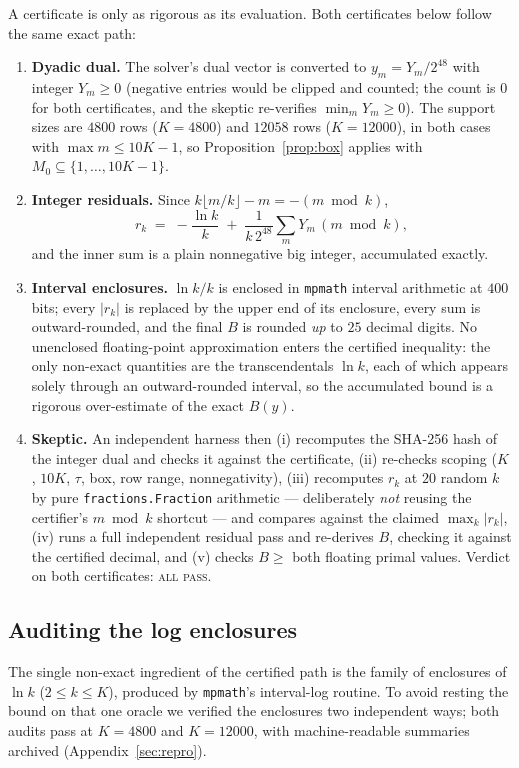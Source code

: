 \documentclass[11pt]{article}
\theoremstyle{remark}
\begin{document}
A certificate is only as rigorous as its evaluation. Both certificates
below follow the same exact path:
\begin{enumerate}
\item \textbf{Dyadic dual.} The solver's dual vector is converted to
$y_m = Y_m / 2^{48}$ with integer $Y_m \ge 0$ (negative entries would be
clipped and counted; the count is $0$ for both certificates, and the
skeptic re-verifies $\min_m Y_m \ge 0$). The support sizes are $4800$
rows ($K = 4800$) and $12058$ rows ($K = 12000$), in both cases with
$\max m \le 10K - 1$, so Proposition~\ref{prop:box} applies with
$M_0 \subseteq \{1,\dots,10K-1\}$.
\item \textbf{Integer residuals.} Since $k\lfloor m/k\rfloor - m =
-(m \bmod k)$,
\[
r_k \;=\; -\frac{\ln k}{k} \;+\; \frac{1}{k\, 2^{48}}
\sum_{m} Y_m\, (m \bmod k),
\]
and the inner sum is a plain nonnegative big integer, accumulated exactly.
\item \textbf{Interval enclosures.} $\ln k / k$ is enclosed in
\texttt{mpmath} interval arithmetic at $400$ bits; every $|r_k|$ is
replaced by the upper end of its enclosure, every sum is outward-rounded,
and the final $B$ is rounded \emph{up} to $25$ decimal digits. No
unenclosed floating-point approximation enters the certified inequality:
the only non-exact quantities are the transcendentals $\ln k$, each of which
appears solely through an outward-rounded interval, so the accumulated bound
is a rigorous over-estimate of the exact $B(y)$.
\item \textbf{Skeptic.} An independent harness then (i) recomputes the
SHA-256 hash of the integer dual and checks it against the certificate,
(ii) re-checks scoping ($K$, $10K$, $\tau$, box, row range, nonnegativity),
(iii) recomputes $r_k$ at $20$ random $k$ by pure
\texttt{fractions.Fraction} arithmetic --- deliberately \emph{not} reusing
the certifier's $m \bmod k$ shortcut --- and compares against the claimed
$\max_k |r_k|$, (iv) runs a full independent residual pass and re-derives
$B$, checking it against the certified decimal, and (v) checks
$B \ge$ both floating primal values. Verdict on both certificates:
\textsc{all pass}.
\end{enumerate}

\subsection{Auditing the log enclosures}\label{sec:logaudit}

The single non-exact ingredient of the certified path is the family of
enclosures of $\ln k$ ($2 \le k \le K$), produced by \texttt{mpmath}'s
interval-log routine. To avoid resting the bound on that one oracle we
verified the enclosures two independent ways; both audits pass at $K=4800$
and $K=12000$, with machine-readable summaries archived
(Appendix~\ref{sec:repro}).
\end{document}
